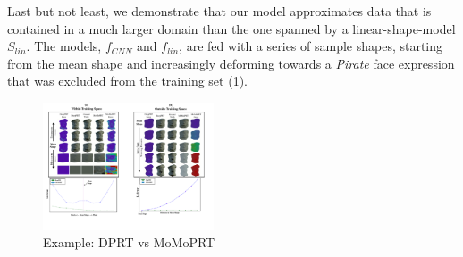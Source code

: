 Last but not least, we demonstrate that our model approximates data that is contained in a much larger domain than the one spanned by a linear-shape-model $S_{lin}$. The models, $f_{CNN}$ and $f_{lin}$, are fed with a series of sample shapes, starting from the mean shape and increasingly deforming towards a \textit{Pirate} face expression that was excluded from the training set (\ref{Fig:DPRT vs MoMoPRT B}). 
\begin{figure}[H]
  \centering
    \includegraphics[width=0.45\textwidth]{Figures/DPRT_vs_MoMoPRT_b.pdf}
     \caption{Example: DPRT vs MoMoPRT}
     \label{Fig:DPRT vs MoMoPRT B}
\end{figure}

